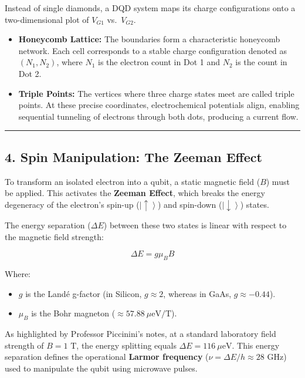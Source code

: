 \documentclass[
]{article}
\providecommand{\tightlist}{%
  \setlength{\itemsep}{0pt}\setlength{\parskip}{0pt}}
\begin{document}
Instead of single diamonds, a DQD system maps its charge configurations
onto a two-dimensional plot of \(V_{G1}\) vs.~\(V_{G2}\).

\begin{itemize}
\tightlist
\item
  \textbf{Honeycomb Lattice:} The boundaries form a characteristic
  honeycomb network. Each cell corresponds to a stable charge
  configuration denoted as \((N_1, N_2)\), where \(N_1\) is the electron
  count in Dot 1 and \(N_2\) is the count in Dot 2.
\item
  \textbf{Triple Points:} The vertices where three charge states meet
  are called triple points. At these precise coordinates,
  electrochemical potentials align, enabling sequential tunneling of
  electrons through both dots, producing a current flow.
\end{itemize}

\begin{center}\rule{0.5\linewidth}{0.5pt}\end{center}

\subsection{4. Spin Manipulation: The Zeeman
Effect}\label{spin-manipulation-the-zeeman-effect}

To transform an isolated electron into a qubit, a static magnetic field
(\(B\)) must be applied. This activates the \textbf{Zeeman Effect},
which breaks the energy degeneracy of the electron's spin-up
(\(\left|\uparrow\right\rangle\)) and spin-down
(\(\left|\downarrow\right\rangle\)) states.

The energy separation (\(\Delta E\)) between these two states is linear
with respect to the magnetic field strength:

\[\Delta E = g \mu_B B\]

Where:

\begin{itemize}
\tightlist
\item
  \(g\) is the Landé g-factor (in Silicon, \(g \approx 2\), whereas in
  GaAs, \(g \approx -0.44\)).
\item
  \(\mu_B\) is the Bohr magneton (\(\approx 57.88\ \mu\text{eV/T}\)).
\end{itemize}

As highlighted by Professor Piccinini's notes, at a standard laboratory
field strength of \(B = 1\text{ T}\), the energy splitting equals
\(\Delta E = 116\ \mu\text{eV}\). This energy separation defines the
operational \textbf{Larmor frequency}
(\(\nu = \Delta E / h \approx 28\text{ GHz}\)) used to manipulate the
qubit using microwave pulses.
\end{document}
